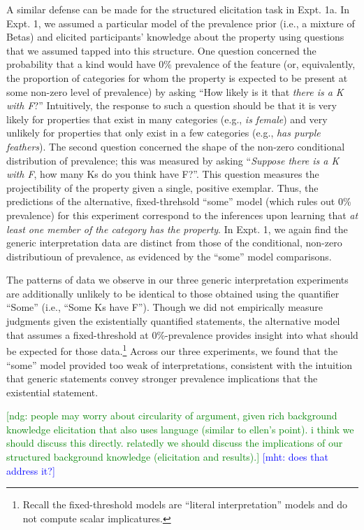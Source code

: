 \documentclass[,man,floatsintext]{apa6}
\let\rmarkdownfootnote\footnote%
\def\footnote{\protect\rmarkdownfootnote}
\theoremstyle{definition}
\theoremstyle{definition}
\theoremstyle{definition}
\theoremstyle{remark}
\begin{document}
A similar defense can be made for the structured elicitation task in
Expt. 1a. In Expt. 1, we assumed a particular model of the prevalence
prior (i.e., a mixture of Betas) and elicited participants' knowledge
about the property using questions that we assumed tapped into this
structure. One question concerned the probability that a kind would have
0\% prevalence of the feature (or, equivalently, the proportion of
categories for whom the property is expected to be present at some
non-zero level of prevalence) by asking \enquote{How likely is it that
\emph{there is a K with F}?} Intuitively, the response to such a
question should be that it is very likely for properties that exist in
many categories (e.g., \emph{is female}) and very unlikely for
properties that only exist in a few categories (e.g., \emph{has purple
feathers}). The second question concerned the shape of the non-zero
conditional distribution of prevalence; this was measured by asking
\enquote{\emph{Suppose there is a K with F}, how many Ks do you think
have F?}. This question measures the projectibility of the property
given a single, positive exemplar. Thus, the predictions of the
alternative, fixed-threhsold \enquote{some} model (which rules out 0\%
prevalence) for this experiment correspond to the inferences upon
learning that \emph{at least one member of the category has the
property}. In Expt. 1, we again find the generic interpretation data are
distinct from those of the conditional, non-zero distributioun of
prevalence, as evidenced by the \enquote{some} model comparisons.

The patterns of data we observe in our three generic interpretation
experiments are additionally unlikely to be identical to those obtained
using the quantifier \enquote{Some} (i.e., \enquote{Some Ks have F}).
Though we did not empirically measure judgments given the existentially
quantified statements, the alternative model that assumes a
fixed-threshold at 0\%-prevalence provides insight into what should be
expected for those data.\footnote{Recall the fixed-threshold models are
  \enquote{literal interpretation} models and do not compute scalar
  implicatures.} Across our three experiments, we found that the
\enquote{some} model provided too weak of interpretations, consistent
with the intuition that generic statements convey stronger prevalence
implications that the existential statement.

{\textcolor{Green}{[ndg: people may worry about circularity of argument, given rich background knowledge elicitation that also uses language (similar to ellen's point). i think we should discuss this directly. relatedly we should discuss the implications of our structured background knowledge (elicitation and results).]}}
{\textcolor{Blue}{[mht: does that address it?]}}
\end{document}
